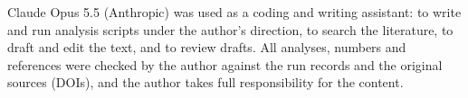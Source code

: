 Claude Opus 5.5 (Anthropic) was used as a coding and writing assistant: to write and run analysis scripts under the
author's direction, to search the literature, to draft and edit the text, and to review drafts. All analyses, numbers
and references were checked by the author against the run records and the original sources (DOIs), and the author
takes full responsibility for the content.
